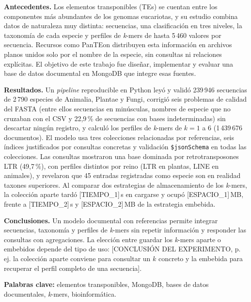 
\textbf{Antecedentes.} Los elementos transponibles (TEs) se cuentan
entre los componentes más abundantes de los genomas eucariotas, y su
estudio combina datos de naturaleza muy distinta: secuencias, una
clasificación en tres niveles, la taxonomía de cada especie y perfiles
de \textit{k}-mers de hasta 5\,460 valores por secuencia. Recursos como
PanTEon distribuyen esta información en archivos planos unidos solo por
el nombre de la especie, sin consultas ni relaciones explícitas. El
objetivo de este trabajo fue diseñar, implementar y evaluar una base de
datos documental en MongoDB que integre esas fuentes.

\textbf{Resultados.} Un \textit{pipeline} reproducible en Python leyó
y validó 239\,946 secuencias de 2\,790 especies de Animalia, Plantae y
Fungi, corrigió seis problemas de calidad del FASTA (entre ellos
secuencias en minúsculas, nombres de especie que no cruzaban con el CSV
y 22,9\,\% de secuencias con bases indeterminadas) sin descartar
ningún registro, y calculó los perfiles de \textit{k}-mers de $k=1$ a
6 (1\,439\,676 documentos). El modelo usa tres colecciones relacionadas
por referencias, seis índices justificados por consultas concretas y
validación \texttt{\$jsonSchema} en todas las colecciones. Las
consultas mostraron una base dominada por retrotransposones LTR
(49,7\,\%), con perfiles distintos por reino (LTR en plantas, LINE en
animales), y revelaron que 45 entradas registradas como especie son en
realidad taxones superiores. Al comparar dos estrategias de
almacenamiento de los \textit{k}-mers, la colección aparte tardó
[TIEMPO\_1]\,s en cargarse y ocupó [ESPACIO\_1]\,MB, frente a
[TIEMPO\_2]\,s y [ESPACIO\_2]\,MB de la estrategia embebida.

\textbf{Conclusiones.} Un modelo documental con referencias permite
integrar secuencias, taxonomía y perfiles de \textit{k}-mers sin
repetir información y responder las consultas con agregaciones. La
elección entre guardar los \textit{k}-mers aparte o embebidos depende
del tipo de uso: [CONCLUSIÓN DEL EXPERIMENTO, p. ej. la colección aparte
conviene para consultar un $k$ concreto y la embebida para recuperar el
perfil completo de una secuencia].

\medskip
\noindent\textbf{Palabras clave:} elementos transponibles, MongoDB,
bases de datos documentales, \textit{k}-mers, bioinformática.
